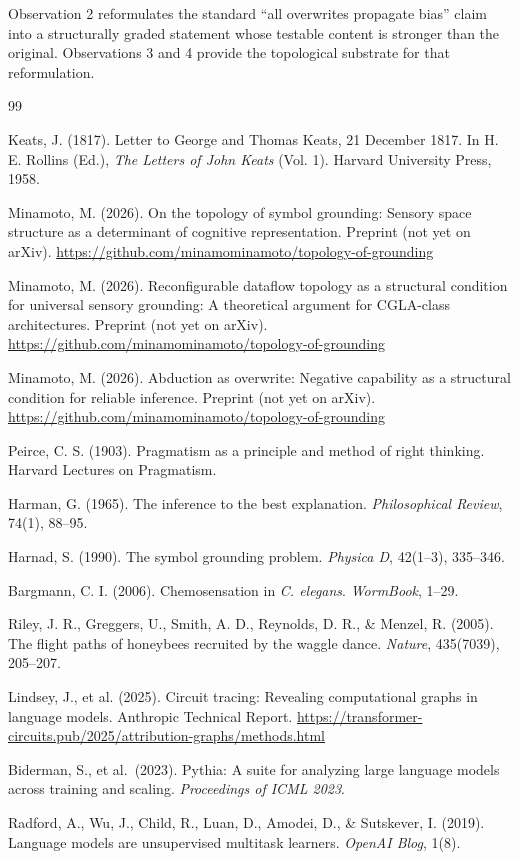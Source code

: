 \documentclass[12pt]{article}
\begin{document}
Observation 2 reformulates the standard ``all overwrites propagate
bias'' claim into a structurally graded statement whose testable
content is stronger than the original. Observations 3 and 4 provide
the topological substrate for that reformulation.

\begin{thebibliography}{99}

Keats, J. (1817).
Letter to George and Thomas Keats, 21 December 1817.
In H. E. Rollins (Ed.), \textit{The Letters of John Keats} (Vol. 1).
Harvard University Press, 1958.

Minamoto, M. (2026).
On the topology of symbol grounding: Sensory space structure as a
determinant of cognitive representation.
Preprint (not yet on arXiv).
\url{https://github.com/minamominamoto/topology-of-grounding}

Minamoto, M. (2026).
Reconfigurable dataflow topology as a structural condition for
universal sensory grounding: A theoretical argument for CGLA-class
architectures.
Preprint (not yet on arXiv).
\url{https://github.com/minamominamoto/topology-of-grounding}

Minamoto, M. (2026).
Abduction as overwrite: Negative capability as a structural condition
for reliable inference.
Preprint (not yet on arXiv).
\url{https://github.com/minamominamoto/topology-of-grounding}

Peirce, C. S. (1903).
Pragmatism as a principle and method of right thinking.
Harvard Lectures on Pragmatism.

Harman, G. (1965).
The inference to the best explanation.
\textit{Philosophical Review}, 74(1), 88--95.

Harnad, S. (1990).
The symbol grounding problem.
\textit{Physica D}, 42(1--3), 335--346.

Bargmann, C. I. (2006).
Chemosensation in \textit{C. elegans}.
\textit{WormBook}, 1--29.

Riley, J. R., Greggers, U., Smith, A. D., Reynolds, D. R., \& Menzel, R. (2005).
The flight paths of honeybees recruited by the waggle dance.
\textit{Nature}, 435(7039), 205--207.

Lindsey, J., et al. (2025).
Circuit tracing: Revealing computational graphs in language models.
Anthropic Technical Report.
\url{https://transformer-circuits.pub/2025/attribution-graphs/methods.html}

Biderman, S., et al.\ (2023).
Pythia: A suite for analyzing large language models across training and scaling.
\textit{Proceedings of ICML 2023}.

Radford, A., Wu, J., Child, R., Luan, D., Amodei, D., \& Sutskever, I. (2019).
Language models are unsupervised multitask learners.
\textit{OpenAI Blog}, 1(8).

\end{thebibliography}
\end{document}
